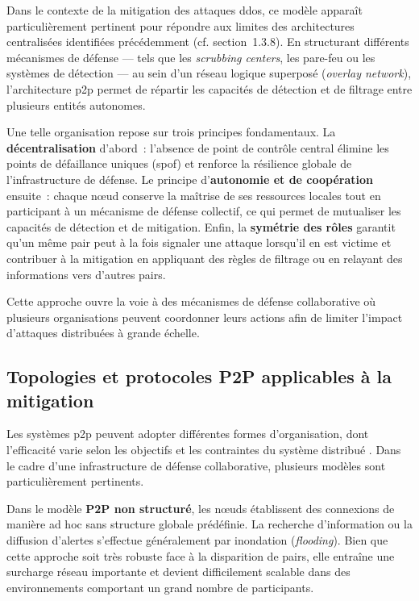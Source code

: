 Dans le contexte de la mitigation des attaques \gls{ddos}, ce modèle apparaît particulièrement pertinent pour répondre aux limites des architectures centralisées identifiées précédemment (cf. section~1.3.8). En structurant différents mécanismes de défense — tels que les \textit{scrubbing centers}, les pare-feu ou les systèmes de détection — au sein d'un réseau logique superposé (\textit{overlay network}), l'architecture \gls{p2p} permet de répartir les capacités de détection et de filtrage entre plusieurs entités autonomes.

Une telle organisation repose sur trois principes fondamentaux. La \textbf{décentralisation} d'abord~: l'absence de point de contrôle central élimine les points de défaillance uniques (\gls{spof}) et renforce la résilience globale de l'infrastructure de défense. Le principe d'\textbf{autonomie et de coopération} ensuite~: chaque n\oe{}ud conserve la maîtrise de ses ressources locales tout en participant à un mécanisme de défense collectif, ce qui permet de mutualiser les capacités de détection et de mitigation. Enfin, la \textbf{symétrie des rôles} garantit qu'un même pair peut à la fois signaler une attaque lorsqu'il en est victime et contribuer à la mitigation en appliquant des règles de filtrage ou en relayant des informations vers d'autres pairs.

Cette approche ouvre la voie à des mécanismes de défense collaborative où plusieurs organisations peuvent coordonner leurs actions afin de limiter l'impact d'attaques distribuées à grande échelle.

\subsection{Topologies et protocoles P2P applicables à la mitigation}

Les systèmes \gls{p2p} peuvent adopter différentes formes d'organisation, dont l'efficacité varie selon les objectifs et les contraintes du système distribué \parencite{tanenbaum2017distributed}. Dans le cadre d'une infrastructure de défense collaborative, plusieurs modèles sont particulièrement pertinents.

Dans le modèle \textbf{P2P non structuré}, les n\oe{}uds établissent des connexions de manière ad hoc sans structure globale prédéfinie. La recherche d'information ou la diffusion d'alertes s'effectue généralement par inondation (\textit{flooding}). Bien que cette approche soit très robuste face à la disparition de pairs, elle entraîne une surcharge réseau importante et devient difficilement scalable dans des environnements comportant un grand nombre de participants.


